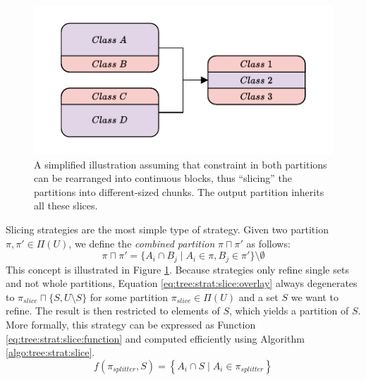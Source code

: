 			\begin{figure}[ht!]
				\centering
				\includegraphics[scale=1.2]{Bilder/DrawIO/strat_slicing_pdf}
				\caption{A simplified illustration assuming that constraint in both partitions can be rearranged into continuous blocks, thus \enquote{slicing} the partitions into different-sized chunks. The output partition inherits all these slices.}
				\label{fig:tree:strat:slice}
			\end{figure}
		
			Slicing strategies are the most simple type of strategy.
			Given two partition $\pi, \pi' \in \Pi(U)$, we define the \textit{combined partition} $\pi \sqcap \pi'$ as follows:
			\begin{equation}
				\label{eq:tree:strat:slice:overlay}
				\pi \sqcap \pi' = \{ A_i \cap B_j \mid A_i \in \pi, B_j \in \pi' \} \setminus \emptyset
			\end{equation}
			This concept is illustrated in Figure \ref{fig:tree:strat:slice}.
			Because strategies only refine single sets and not whole partitions, Equation \ref{eq:tree:strat:slice:overlay} always degenerates to $\pi_{slice} \sqcap \{ S, U \setminus S \}$ for some partition $\pi_{slice} \in \Pi(U)$ and a set $S$ we want to refine.
			The result is then restricted to elements of $S$, which yields a partition of $S$.
			More formally, this strategy can be expressed as Function \ref{eq:tree:strat:slice:function} and computed efficiently using Algorithm \ref{algo:tree:strat:slice}. 
			\begin{equation}
			\label{eq:tree:strat:slice:function}
				f(\pi_{splitter}, S) = \left\{ A_i \cap S \mid A_i \in \pi_{splitter} \right\}
			\end{equation}
		
